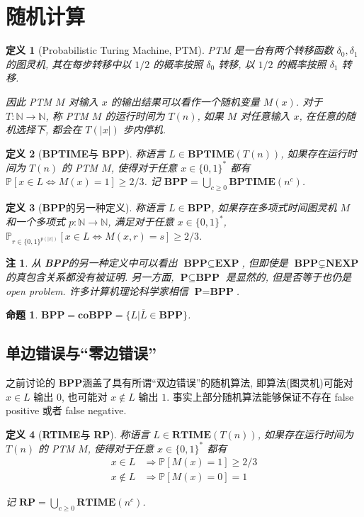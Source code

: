 \documentclass[8pt]{article}
\theoremstyle{compact}
\newtheorem{definition}{定义}[section]
\newtheorem{proposition}{命题}[section]
\newtheorem{remark}{注}[section]
\def\ge{\geqslant}
\def\P{\textbf{P}}
\def\EXP{\textbf{EXP}}
\def\NEXP{\textbf{NEXP}}
\def\BPTIME{\textbf{BPTIME}}
\def\BPP{\textbf{BPP}}
\def\coBPP{\textbf{coBPP}}
\def\RTIME{\textbf{RTIME}}
\def\RP{\textbf{RP}}
\begin{document}
\section{随机计算}
\begin{definition}[Probabilistic Turing Machine, PTM]
	PTM 是一台有两个转移函数 $\delta_0, \delta_1$ 的图灵机, 其在每步转移中以 $1/2$ 的概率按照 $\delta_0$ 转移, 以 $1/2$ 的概率按照 $\delta_1$ 转移.
	
	因此 PTM $M$ 对输入 $x$ 的输出结果可以看作一个随机变量 $M(x)$. 对于 $T: \mathbb N \to \mathbb N$, 称 PTM $M$ 的运行时间为 $T(n)$, 如果 $M$ 对任意输入 $x$, 在任意的随机选择下, 都会在 $T(|x|)$ 步内停机.
\end{definition}
\begin{definition}[\BPTIME 与 \BPP]
	称语言 $L \in \BPTIME(T(n))$, 如果存在运行时间为 $T(n)$ 的 PTM $M$, 使得对于任意 $x \in \{0, 1\}^*$ 都有 $\mathbb P[x \in L \Leftrightarrow M(x) = 1] \ge 2/3$. 记 $\BPP = \bigcup_{c \ge 0}\BPTIME(n^c)$.
\end{definition}
\begin{definition}[\BPP 的另一种定义]
	称语言 $L \in \BPP$, 如果存在多项式时间图灵机 $M$ 和一个多项式 $p: \mathbb N \to \mathbb N$, 满足对于任意 $x \in \{0, 1\}^*$, $\mathbb P_{r \in \{0, 1\}^{p(|x|)}}[x \in L \Leftrightarrow M(x, r) = s] \ge 2/3$.
\end{definition}
\begin{remark}
	从 \BPP 的另一种定义中可以看出 $\BPP \subseteq \EXP$, 但即使是 $\BPP \subsetneq \NEXP$ 的真包含关系都没有被证明. 另一方面, $\P \subseteq \BPP$ 是显然的, 但是否等于也仍是 open problem. 许多计算机理论科学家相信 $\P = \BPP$.
\end{remark}
\begin{proposition}
	$\BPP = \coBPP = \{L | \overline{L} \in \BPP\}$.
\end{proposition}
\subsection{单边错误与“零边错误”}
之前讨论的 \BPP 涵盖了具有所谓“双边错误”的随机算法, 即算法(图灵机)可能对 $x \in L$ 输出 $0$, 也可能对 $x \notin L$ 输出 $1$. 事实上部分随机算法能够保证不存在 false positive 或者 false negative.
\begin{definition}[\RTIME 与 \RP]
	称语言 $L \in \RTIME(T(n))$, 如果存在运行时间为 $T(n)$ 的 PTM $M$, 使得对于任意 $x \in \{0, 1\}^*$ 都有 \begin{equation*}
		\begin{split}
			x \in L &\Rightarrow \mathbb P[M(x) = 1] \ge 2/3 \\
			x \notin L &\Rightarrow \mathbb P[M(x) = 0] = 1
		\end{split}
	\end{equation*}
	
	记 $\RP = \bigcup_{c \ge 0} \RTIME(n^c)$.
\end{definition}
\end{document}
